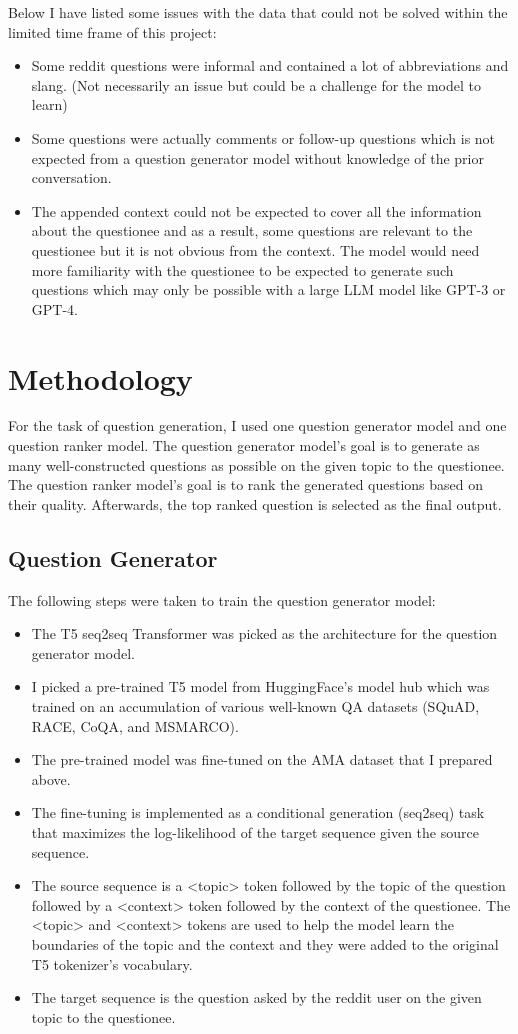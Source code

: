 \documentclass[paper=a4, fontsize=11pt]{scrartcl}
\numberwithin{equation}{section}		%
\numberwithin{figure}{section}			%
\numberwithin{table}{section}				%
\begin{document}
Below I have listed some issues with the data that could not be solved within the limited time frame of this project:
\begin{itemize}
  \item Some reddit questions were informal and contained a lot of abbreviations and slang. (Not necessarily an issue but could be a challenge for the model to learn)
  \item Some questions were actually comments or follow-up questions which is not expected from a question generator model without knowledge of the prior conversation.
  \item The appended context could not be expected to cover all the information about the questionee and as a result, some questions are relevant to the questionee but it is not obvious from the context. The model would need more familiarity with the questionee to be expected to generate such questions which may only be possible with a large LLM model like GPT-3 or GPT-4.
\end{itemize}

\section{Methodology}
For the task of question generation, I used one question generator model and one question ranker model. 
The question generator model's goal is to generate as many well-constructed questions as possible on the given topic to the questionee.
The question ranker model's goal is to rank the generated questions based on their quality.
Afterwards, the top ranked question is selected as the final output.

\subsection{Question Generator}
The following steps were taken to train the question generator model:
\begin{itemize}
  \item The T5 seq2seq Transformer was picked as the architecture for the question generator model.
  \item I picked a pre-trained T5 model from HuggingFace's model hub which was trained on an accumulation of various well-known QA datasets (SQuAD, RACE, CoQA, and MSMARCO).
  \item The pre-trained model was fine-tuned on the AMA dataset that I prepared above.
  \item The fine-tuning is implemented as a conditional generation (seq2seq) task that maximizes the log-likelihood of the target sequence given the source sequence.
  \item The source sequence is a <topic> token followed by the topic of the question followed by a <context> token followed by the context of the questionee. The <topic> and <context> tokens are used to help the model learn the boundaries of the topic and the context and they were added to the original T5 tokenizer's vocabulary.
  \item The target sequence is the question asked by the reddit user on the given topic to the questionee.
\end{itemize}
\end{document}
